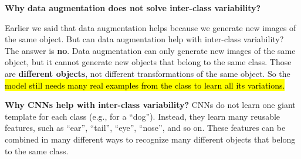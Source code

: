 \highspace
\begin{flushleft}
    \textcolor{Red2}{ \textbf{Why data augmentation does not solve inter-class variability?}}
\end{flushleft}
Earlier we said that data augmentation helps because we generate new images of the same object. But can data augmentation help with inter-class variability? The answer is \textbf{no}. Data augmentation can only generate new images of the same object, but it cannot generate new objects that belong to the same class. Those are \textbf{different objects}, not different transformations of the same object. So the \hl{model still needs many real examples from the class to learn all its variations.}

\highspace
\textcolor{Green3}{ \textbf{Why CNNs help with inter-class variability?}} CNNs do not learn one giant template for each class (e.g., for a ``dog''). Instead, they learn many reusable features, such as ``ear'', ``tail'', ``eye'', ``nose'', and so on. These features can be combined in many different ways to recognize many different objects that belong to the same class.